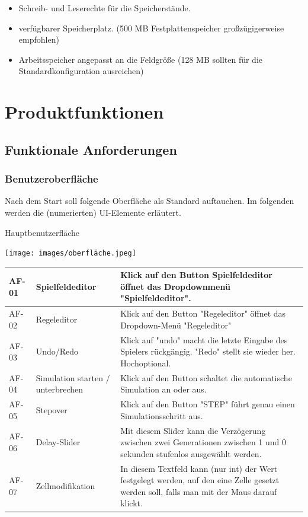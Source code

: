 \documentclass[11pt]{article}
\begin{document}
\begin{itemize}
    \item Schreib- und Leserechte für die Speicherstände.
    \item verfügbarer Speicherplatz. (500 MB Festplattenspeicher großzügigerweise empfohlen)
    \item Arbeitsspeicher angepasst an die Feldgröße (128 MB sollten für die Standardkonfiguration ausreichen)
\end{itemize}

\pagebreak



\section{Produktfunktionen}
\subsection{Funktionale Anforderungen}
\subsubsection{Benutzeroberfläche}
Nach dem Start soll folgende Oberfläche als Standard auftauchen. Im folgenden werden die (numerierten) UI-Elemente erläutert.
\par
Hauptbenutzerfläche
\par
\texttt{[image: images/oberfläche.jpeg]}

\begin{longtable}[m]{|m{2cm}|m{4cm}|m{9cm}|}
\hline
 AF-01 & Spielfeldeditor & Klick auf den Button Spielfeldeditor öffnet das Dropdownmenü "Spielfeldeditor".   \\
 \hline
AF-02 & Regeleditor & Klick auf den Button "Regeleditor" öffnet das Dropdown-Menü "Regeleditor" \\
 \hline
AF-03& Undo/Redo& Klick auf "undo" macht die letzte Eingabe des Spielers rückgängig. "Redo" stellt sie wieder her. Hochoptional. \\
 \hline
 AF-04 & Simulation starten / unterbrechen & Klick auf den Button schaltet die automatische Simulation an oder aus. \\
 \hline
 AF-05& Stepover & Klick auf den Button "STEP" führt genau einen Simulationsschritt aus.  \\

\hline
 AF-06 & Delay-Slider & Mit diesem Slider kann die Verzögerung zwischen zwei Generationen zwischen 1 und 0 sekunden stufenlos ausgewählt werden. \\
 \hline
 AF-07 & Zellmodifikation & In diesem Textfeld kann (nur int) der Wert festgelegt werden, auf den eine Zelle gesetzt werden soll, falls man mit der Maus darauf klickt.  \\
\hline
\end{longtable}
\end{document}
